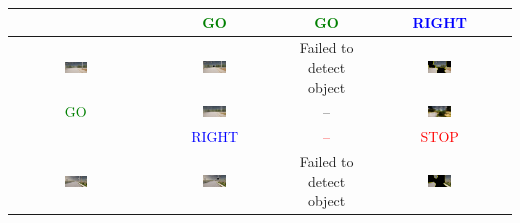 \begin{samepage}
\begin{table}[h]
\begin{tabular}{c|c|c|c}
& \textcolor{green}{GO} & \textcolor{green}{GO} & \textcolor{blue}{RIGHT} \\

\midrule

\includegraphics[width=0.18\textwidth]{img/appendix/original_town7_000919.png} &
\includegraphics[width=0.18\textwidth]{img/appendix/grid_masked_town7_000919.png} &
\makecell[c]{\footnotesize Failed to \\ \footnotesize detect object} &
\includegraphics[width=0.18\textwidth]{img/appendix/LIME_on_Image_maksed_town7_000919.png} \\

\textcolor{green}{GO} &
\includegraphics[width=0.18\textwidth]{img/appendix/grid_reconstructed_town7_000919.png} &
-- &
\includegraphics[width=0.18\textwidth]{img/appendix/LIME_on_Image_reconstructed_town7_000919.png} \\

& \textcolor{blue}{RIGHT} & \textcolor{red}{--} & \textcolor{red}{STOP} \\

\midrule

\includegraphics[width=0.18\textwidth]{img/appendix/original_town7_010910.png} &
\includegraphics[width=0.18\textwidth]{img/appendix/grid_masked_town7_010910.png} &
\makecell[c]{\footnotesize Failed to \\ \footnotesize detect object} &
\includegraphics[width=0.18\textwidth]{img/appendix/LIME_on_Image_maksed_town7_010910.png} \\


\end{tabular}
\end{table}
\end{samepage}
